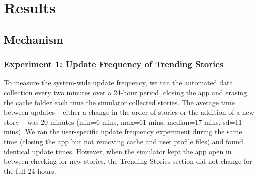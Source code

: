 \section{Results}



\subsection{Mechanism}
\subsubsection{Experiment 1: Update Frequency of Trending Stories}
To measure the system-wide update frequency, we ran the automated data collection every two minutes over a 24-hour period, closing the app and erasing the cache folder each time the simulator collected stories. The average time between updates -- either a change in the order of stories or the addition of a new story -- was 20 minutes (min=6 mins, max=61 mins, median=17 mins, sd=11 mins). We ran the user-specific update frequency experiment during the same time (closing the app but not removing cache and user profile files) and found identical update times. However, when the simulator kept the app open in between checking for new stories, the Trending Stories section did not change for the full 24 hours.



